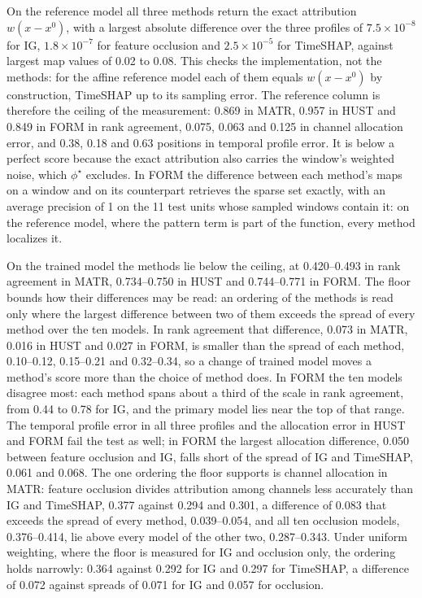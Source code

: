 \documentclass{article}
\begin{document}
On the reference model all three methods return the exact attribution $w(x - x^{0})$, with a largest absolute difference over the three profiles of $7.5\times10^{-8}$ for IG, $1.8\times10^{-7}$ for feature occlusion and $2.5\times10^{-5}$ for TimeSHAP, against largest map values of 0.02 to 0.08. This checks the implementation, not the methods: for the affine reference model each of them equals $w(x - x^{0})$ by construction, TimeSHAP up to its sampling error. The reference column is therefore the ceiling of the measurement: 0.869 in MATR, 0.957 in HUST and 0.849 in FORM in rank agreement, 0.075, 0.063 and 0.125 in channel allocation error, and 0.38, 0.18 and 0.63 positions in temporal profile error. It is below a perfect score because the exact attribution also carries the window's weighted noise, which $\phi^{\star}$ excludes. In FORM the difference between each method's maps on a window and on its counterpart retrieves the sparse set exactly, with an average precision of 1 on the 11 test units whose sampled windows contain it: on the reference model, where the pattern term is part of the function, every method localizes it.

On the trained model the methods lie below the ceiling, at 0.420--0.493 in rank agreement in MATR, 0.734--0.750 in HUST and 0.744--0.771 in FORM. The floor bounds how their differences may be read: an ordering of the methods is read only where the largest difference between two of them exceeds the spread of every method over the ten models. In rank agreement that difference, 0.073 in MATR, 0.016 in HUST and 0.027 in FORM, is smaller than the spread of each method, 0.10--0.12, 0.15--0.21 and 0.32--0.34, so a change of trained model moves a method's score more than the choice of method does. In FORM the ten models disagree most: each method spans about a third of the scale in rank agreement, from 0.44 to 0.78 for IG, and the primary model lies near the top of that range. The temporal profile error in all three profiles and the allocation error in HUST and FORM fail the test as well; in FORM the largest allocation difference, 0.050 between feature occlusion and IG, falls short of the spread of IG and TimeSHAP, 0.061 and 0.068. The one ordering the floor supports is channel allocation in MATR: feature occlusion divides attribution among channels less accurately than IG and TimeSHAP, 0.377 against 0.294 and 0.301, a difference of 0.083 that exceeds the spread of every method, 0.039--0.054, and all ten occlusion models, 0.376--0.414, lie above every model of the other two, 0.287--0.343. Under uniform weighting, where the floor is measured for IG and occlusion only, the ordering holds narrowly: 0.364 against 0.292 for IG and 0.297 for TimeSHAP, a difference of 0.072 against spreads of 0.071 for IG and 0.057 for occlusion.
\end{document}
